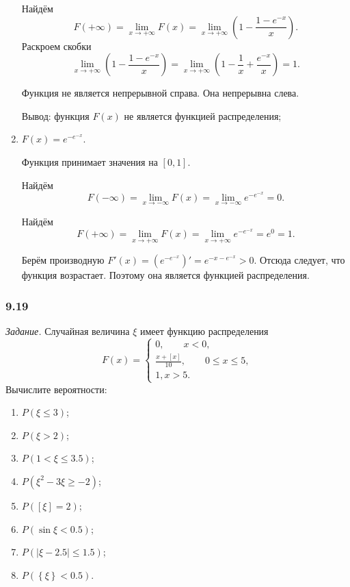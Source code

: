 \begin{enumerate}[label=\alph*)]
Найдём
$$F \left( + \infty \right) =
\lim \limits_{x \to + \infty } F \left( x \right) =
\lim \limits_{x \to + \infty } \left( 1 - \frac{1-e^{-x}}{x} \right).$$
Раскроем скобки
$$\lim \limits_{x \to + \infty } \left( 1 - \frac{1-e^{-x}}{x} \right) =
\lim \limits_{x \to + \infty } \left( 1 - \frac{1}{x} + \frac{e^{-x}}{x} \right) =
1.$$

Функция не является непрерывной справа.
Она непрерывна слева.

Вывод: функция $F \left( x \right) $ не является функцией распределения;
\item $F \left( x \right) = e^{-e^{-x}}$.

Функция принимает значения на $ \left[ 0, 1 \right] $.

Найдём
$$F \left( - \infty \right) =
\lim \limits_{x \to - \infty } F \left( x \right) =
\lim \limits_{x \to - \infty } e^{-e^{-x}} =
0.$$

Найдём
$$F \left( + \infty \right) =
\lim \limits_{x \to + \infty } F \left( x \right) =
\lim \limits_{x \to + \infty } e^{-e^{-x}} =
e^0 =
1.$$

Берём производную $F' \left( x \right) = \left( e^{-e^{-x}} \right)' = e^{-x-e^{-x}} > 0$.
Отсюда следует, что функция возрастает.
Поэтому она является функцией распределения.
\end{enumerate}

\subsubsection*{9.19}

\textit{Задание.} Случайная величина $ \xi $ имеет функцию распределения
$$F \left( x \right) =
\begin{cases}
0, \qquad x < 0, \\
\frac{x + \left[ x \right] }{10}, \qquad 0 \leq x \leq 5, \\
1, x > 5.
\end{cases}$$
Вычислите вероятности:
\begin{enumerate}[label=\alph*)]
\item $P \left( \xi \leq 3 \right) $;
\item $P \left( \xi > 2 \right) $;
\item $P \left( 1 < \xi \leq 3.5 \right) $;
\item $P \left( \xi^2 - 3 \xi \geq -2 \right) $;
\item $P \left( \left[ \xi \right] = 2 \right) $;
\item $P \left( \sin \xi < 0.5 \right) $;
\item $P \left( \left| \xi - 2.5 \right| \leq 1.5 \right) $;
\item $P \left( \left\{ \xi \right\} < 0.5 \right) $.
\end{enumerate}


